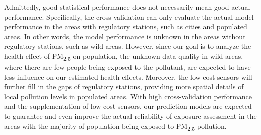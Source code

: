 \documentclass[11pt]{article}
\newcommand{\tsub}{\textsubscript}
\begin{document}
\begin{enumerate*}[{[1)]}]
    \item Admittedly, good statistical performance does not necessarily mean good actual performance. Specifically, the cross-validation can only evaluate the actual model performance in the areas with regulatory stations, such as cities and populated areas. In other words, the model performance is unknown in the areas without regulatory stations, such as wild areas. However, since our goal is to analyze the health effect of PM\tsub{2.5} on population, the unknown data quality in wild areas, where there are few people being exposed to the pollutant, are expected to have less influence on our estimated health effects. Moreover, the low-cost sensors will further fill in the gaps of regulatory stations, providing more spatial details of local pollution levels in populated areas. With high cross-validation performance and the supplementation of low-cost sensors, our prediction models are expected to guarantee and even improve the actual reliability of exposure assessment in the areas with the majority of population being exposed to PM\tsub{2.5} pollution. 
\end{enumerate*}
\end{document}
